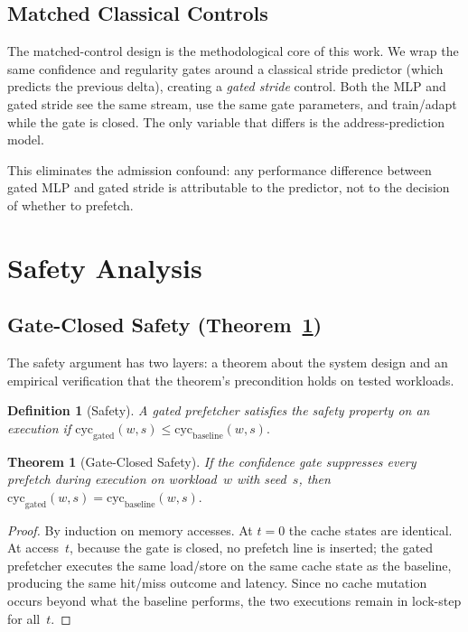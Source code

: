 \documentclass[sigplan,anonymous,review,nonacm]{acmart}
\newtheorem{definition}{Definition}
\newtheorem{theorem}{Theorem}
\begin{document}
\subsection{Matched Classical Controls}
\label{sec:matched}

The matched-control design is the methodological core of this work. We wrap
the same confidence and regularity gates around a classical stride predictor
(which predicts the previous delta), creating a \emph{gated stride} control.
Both the MLP and gated stride see the same stream, use the same gate
parameters, and train/adapt while the gate is closed. The only variable that
differs is the address-prediction model.

This eliminates the admission confound: any performance difference between
gated MLP and gated stride is attributable to the predictor, not to the
decision of whether to prefetch.

\section{Safety Analysis}
\label{sec:safety}

\subsection{Gate-Closed Safety (Theorem~\ref{thm:safety})}

The safety argument has two layers: a theorem about the system design and an
empirical verification that the theorem's precondition holds on tested
workloads.

\begin{definition}[Safety]
\label{def:safety}
A gated prefetcher satisfies the safety property on an execution if
$\text{cyc}_{\text{gated}}(w, s) \leq \text{cyc}_{\text{baseline}}(w, s).$
\end{definition}

\begin{theorem}[Gate-Closed Safety]
\label{thm:safety}
If the confidence gate suppresses every prefetch during execution on
workload~$w$ with seed~$s$, then
$\text{cyc}_{\text{gated}}(w, s) = \text{cyc}_{\text{baseline}}(w, s).$
\end{theorem}

\begin{proof}
By induction on memory accesses. At $t{=}0$ the cache states are identical.
At access~$t$, because the gate is closed, no prefetch line is inserted; the
gated prefetcher executes the same load/store on the same cache state as the
baseline, producing the same hit/miss outcome and latency. Since no cache
mutation occurs beyond what the baseline performs, the two executions remain
in lock-step for all~$t$.
\end{proof}
\end{document}
